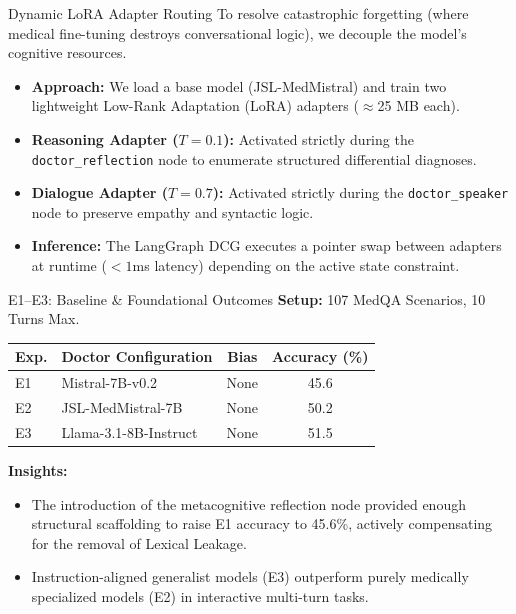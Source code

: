 \documentclass[10pt, aspectratio=169]{beamer}
\begin{document}
\begin{frame}{Dynamic LoRA Adapter Routing}
    To resolve catastrophic forgetting (where medical fine-tuning destroys conversational logic), we decouple the model's cognitive resources.
    \vspace{0.3cm}
    \begin{itemize}
        \item \textbf{Approach:} We load a base model (JSL-MedMistral) and train two lightweight Low-Rank Adaptation (LoRA) adapters ($\approx$25 MB each).
        \item \textbf{Reasoning Adapter ($T=0.1$):} Activated strictly during the \texttt{doctor\_reflection} node to enumerate structured differential diagnoses.
        \item \textbf{Dialogue Adapter ($T=0.7$):} Activated strictly during the \texttt{doctor\_speaker} node to preserve empathy and syntactic logic.
        \item \textbf{Inference:} The LangGraph DCG executes a pointer swap between adapters at runtime ($<1$ms latency) depending on the active state constraint.
    \end{itemize}
\end{frame}

\begin{frame}{E1–E3: Baseline \& Foundational Outcomes}
    \textbf{Setup:} 107 MedQA Scenarios, 10 Turns Max.
    \vspace{0.3cm}
    \begin{table}
        \centering
        \begin{tabular}{llcc}
            \toprule
            \textbf{Exp.} & \textbf{Doctor Configuration} & \textbf{Bias} & \textbf{Accuracy (\%)} \\
            \midrule
            E1 & Mistral-7B-v0.2           & None         & 45.6 \\
            E2 & JSL-MedMistral-7B                 & None         & 50.2 \\
            E3 & Llama-3.1-8B-Instruct             & None         & 51.5 \\
            \bottomrule
        \end{tabular}
    \end{table}
    \vspace{0.1cm}
    \textbf{Insights:}
    \begin{itemize}
        \item The introduction of the metacognitive reflection node provided enough structural scaffolding to raise E1 accuracy to 45.6\%, actively compensating for the removal of Lexical Leakage.
        \item Instruction-aligned generalist models (E3) outperform purely medically specialized models (E2) in interactive multi-turn tasks.
    \end{itemize}
\end{frame}
\end{document}
